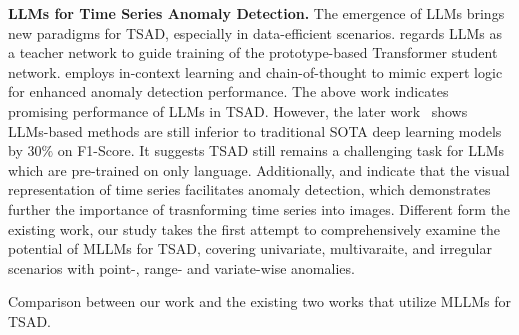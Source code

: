 \textbf{LLMs for Time Series Anomaly Detection.}
The emergence of LLMs brings new paradigms for TSAD, especially in data-efficient scenarios. \cite{liu2024largekd} regards LLMs as a teacher network to guide training of the prototype-based Transformer student network. \cite{liu2024large,dong2024can} employs in-context learning and chain-of-thought to mimic expert logic for enhanced anomaly detection performance. The above work indicates promising performance of LLMs in TSAD. However, the later work~\cite{alnegheimish2024large} shows LLMs-based methods are still inferior to traditional SOTA deep learning models by $30\%$ on F1-Score. It suggests TSAD still remains a challenging task for LLMs which are pre-trained on only language. Additionally, \cite{zhou2024can} and \cite{dong2024can} indicate that the visual representation of time series facilitates anomaly detection, which demonstrates further the importance of trasnforming time series into images. Different form the existing work, our study takes the first attempt to comprehensively examine the potential of MLLMs for TSAD, covering univariate, multivaraite, and irregular scenarios with point-, range- and variate-wise anomalies.  
\begin{table}[!t]
\renewcommand{\arraystretch}{1.2}%
    \centering
    \setlength{\tabcolsep}{4pt}
\caption{Comparison between our work and the existing two works that utilize MLLMs for TSAD.}
\label{tab:related}
\vspace{-0.7cm}
\end{table}
